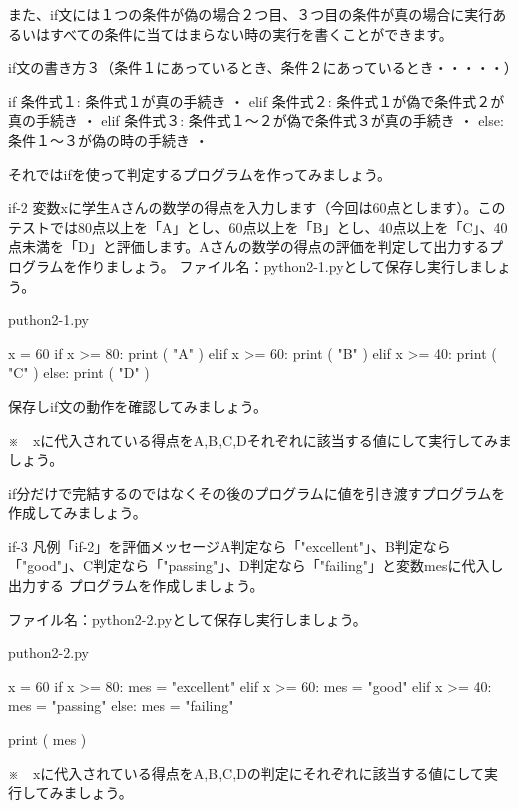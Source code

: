 \documentclass[11pt,a4paper,dvipdfmx,titlepage]{jsreport}
\begin{document}
また、if文には１つの条件が偽の場合２つ目、３つ目の条件が真の場合に実行あるいはすべての条件に当てはまらない時の実行を書くことができます。

\begin{grabox}{if文の書き方３（条件１にあっているとき、条件２にあっているとき・・・・・）}
\begin{listing}{1}
if 条件式１:
    条件式１が真の手続き
    ・
elif 条件式２:
    条件式１が偽で条件式２が真の手続き
    ・
elif 条件式３:
    条件式１～２が偽で条件式３が真の手続き
    ・
else:
    条件１～３が偽の時の手続き
    ・
\end{listing}
\end{grabox}
\newpage
それではifを使って判定するプログラムを作ってみましょう。
\begin{pabox}{if-2}
変数xに学生Aさんの数学の得点を入力します（今回は60点とします）。このテストでは80点以上を「A」とし、60点以上を「B」とし、40点以上を「C」、40点未満を「D」と評価します。Aさんの数学の得点の評価を判定して出力するプログラムを作りましょう。
ファイル名：python2-1.pyとして保存し実行しましょう。
\begin{legbox}{puthon2-1.py}
\begin{listing}{1}
x = 60
if x >= 80:
    print ( "A" )
elif x >= 60:
    print ( "B" )
elif x >= 40:
    print ( "C" )
else:
    print ( "D" )
\end{listing}
\end{legbox}
保存しif文の動作を確認してみましょう。

※　xに代入されている得点をA,B,C,Dそれぞれに該当する値にして実行してみましょう。
\end{pabox}

if分だけで完結するのではなくその後のプログラムに値を引き渡すプログラムを作成してみましょう。
\begin{pabox}{if-3}
凡例「if-2」を評価メッセージA判定なら「"excellent"」、B判定なら「"good"」、C判定なら「"passing"」、D判定なら「"failing"」と変数mesに代入し出力する
プログラムを作成しましょう。

ファイル名：python2-2.pyとして保存し実行しましょう。
\begin{legbox}{puthon2-2.py}
\begin{listing}{1}
x = 60
if x >= 80:
    mes = "excellent"
elif x >= 60:
    mes = "good"
elif x >= 40:
    mes = "passing"
else:
    mes = "failing"

print ( mes )
\end{listing}
\end{legbox}

※　xに代入されている得点をA,B,C,Dの判定にそれぞれに該当する値にして実行してみましょう。
\end{pabox}
\end{document}
